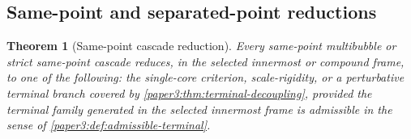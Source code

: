 \documentclass[11pt]{amsart}
\theoremstyle{plain}
\newtheorem{theorem}{Theorem}[section]
\theoremstyle{definition}
\theoremstyle{remark}
\begin{document}
\subsection{Same-point and separated-point reductions}

\begin{theorem}[Same-point cascade reduction]\label{paper3:thm:same-point-reduction}
Every same-point multibubble or strict same-point cascade reduces, in the
selected innermost or compound frame, to one of the following: the single-core
criterion, scale-rigidity, or a perturbative terminal branch covered by
\cref{paper3:thm:terminal-decoupling}, provided the terminal family generated in the
selected innermost frame is admissible in the sense of
\cref{paper3:def:admissible-terminal}.
\end{theorem}
\end{document}
